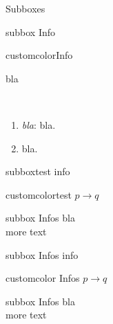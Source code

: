\documentclass[10pt,a4paper]{article}
\begin{document}
\begin{multicols}{3}
\begin{textbox}{Subboxes}
\begin{multibox}{2}
\begin{subbox}{subbox}{ Info}
\end{subbox}
\begin{subbox}{customcolor}{Info}

\end{subbox}
\end{multibox}
\end{textbox}



\begin{textbox}{bla}


\\
\begin{enumerate}
    \item \emph{bla}: bla.
    \item bla.
\end{enumerate}

\begin{multibox}{3} %
\begin{subbox}{subbox}{test}
info
\end{subbox}
\begin{subbox}{customcolor}{test}
$p \to q$
\end{subbox}
\begin{subbox}{subbox}{ Infos}
bla \\
more text
\end{subbox}
\end{multibox}

\begin{multibox}{3} %
\begin{subbox}{subbox}{ Infos}
info
\end{subbox}
\begin{subbox}{customcolor}{ Infos}
$p \to q$
\end{subbox}
\begin{subbox}{subbox}{ Infos}
bla \\
more text
\end{subbox}
\end{multibox}

\end{textbox}


\end{multicols}
\end{document}
